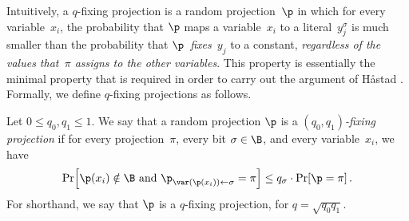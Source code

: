 Intuitively, a $q$-fixing projection is a random projection~$\p$
in which for every variable~$x_{i}$, the probability that $\p$
maps a variable~$x_{i}$ to a literal~$y_{j}^{\sigma}$ is much
smaller than the probability that $\p$~\emph{fixes~}$y_{j}$ to
a constant, \emph{regardless of the values that~$\pi$ assigns to
the other variables}. This property is essentially the minimal property
that is required in order to carry out the argument of H{\aa}stad
\cite{H98}. Formally, we define $q$-fixing projections as follows. 
\begin{definition}
\label{def:fixing-projections}Let $0\le q_{0},q_{1}\le1$. We say that
a random projection $\p$ is a \emph{$(q_{0},q_{1})$-fixing projection}
if for every projection~$\pi$, every bit $\sigma\in\B$, and every
variable~$x_{i}$, we have 
\begin{equation}
\Pr\!\left[\p(x_{i})\notin\B\text{ and }\p_{\var(\p(x_{i}))\gets\sigma}=\pi\right]\le q_{\sigma}\cdot\Pr\!\left[\p=\pi\right].\label{eq:fixing-projection}
\end{equation}
For shorthand, we say that $\p$ is a $q$-fixing projection, for
$q=\sqrt{q_{0}q_{1}}$. 
\end{definition}

